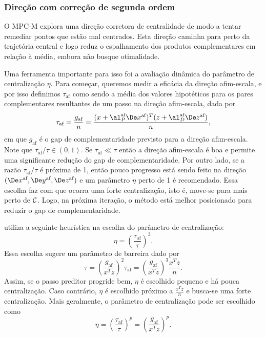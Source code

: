 

\subsubsection{Direção com correção de segunda ordem}

O \ac{MPC-M} explora uma direção corretora de centralidade de modo a
tentar remediar pontos que estão mal centrados. Esta direção caminha para
perto da trajetória central e logo reduz o espalhamento dos produtos
complementares em relação à média, embora não busque otimalidade.

Uma ferramenta importante para isso foi a avaliação dinâmica do parâmetro de
centralização $\eta$. Para começar, queremos medir a eficácia da direção
afim-escala, e por isso definimos $\tau_{\text{af}}$ como sendo a média dos valores
hipotéticos para os pares complementares resultantes de um passo na direção
afim-escala, dada por 
\begin{equation}
\label{eq:tau-affine}
 \tau_{\text{af}} = \frac{g_{\text{af}}}{n} = \frac{(x+\al_P^{\text{af}}\dex)^T
(z+\al_D^{\text{af}}\dez)}{n},
\end{equation}
em que $g_{\text{af}}$ é o gap de complementaridade previsto para a direção afim-escala.
Note que $\tau_{\text{af}}/\tau\in(0,1)$. Se $\tau_{\text{af}}\ll\tau$ então a direção afim-escala é
boa e permite uma significante redução do gap de complementaridade. Por outro
lado, se a razão $\tau_{\text{af}}/\tau$ é próxima de 1, então pouco progresso está sendo
feito na direção  $(\dex, \dey, \dez)$ e um parâmetro $\eta$ perto de 1 é
recomendado. Essa escolha faz com que ocorra uma forte centralização, isto é,
move-se para mais perto de $\mathcal{C}$. Logo, na próxima iteração, o método está
melhor posicionado para reduzir o gap de complementaridade.

 \textcite{Mehrotra:1992wr} utiliza a seguinte heurística na escolha do parâmetro
 de centralização:
\begin{equation}\label{eq:Mehrotra-centralizer-parameter}
\eta = \left(\frac{\tau_{\text{af}}}{\tau}\right)^3.
\end{equation}
Essa escolha sugere um parâmetro de barreira dado por 
\begin{equation}\label{eq:Mehrotra-barrier-parameter}
\tau = \left(\frac{g_{\text{af}}}{x^Tz}\right)^2\tau_{\text{af}} =
\left(\frac{g_{\text{af}}}{x^Tz}\right)^3\frac{x^Tz}{n}.
\end{equation}
Assim, se o passo preditor progride bem, $\eta$ é escolhido pequeno e há
pouca centralização. Caso contrário, $\eta$ é escolhido próximo a $\frac{x^Tz}{n}$ e busca-se
uma forte centralização. Mais geralmente, o parâmetro de
centralização pode ser escolhido como
\[
\eta = \left(\frac{\tau_{\text{af}}}{\tau}\right)^p = \left(\frac{g_{\text{af}}}{x^Tz}\right)^p.
\]

